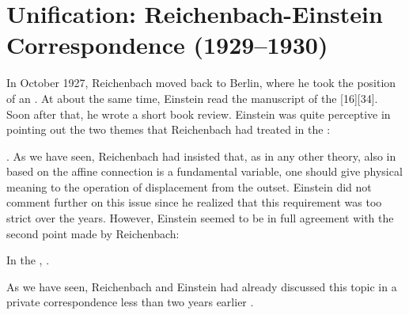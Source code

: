 \documentclass[draft]{article}
\renewcommand{\me}{;~m.e.{}}
\newcommand{\PRZL}{\citetitle{Reichenbach1928}\xspace}
\begin{document}
\section{Unification: Reichenbach-Einstein Correspondence (1929--1930)}
\label{unification}
%
In October 1927, Reichenbach moved back to Berlin, where he took the position of an  \citep{Hecht1982}. At about the same time, Einstein read the manuscript of the \PRZL {}[16][34]. Soon after that, he wrote a short book review. Einstein was quite perceptive in pointing out the two themes that Reichenbach had treated in the \Ap: \begin{inparaenum}[(1)] \item {} \citep[20\me]{Einstein1928d}. As we have seen, Reichenbach had insisted that, as in any other theory, also in \uft based on the affine connection is a fundamental variable, one should give physical meaning to the operation of displacement from the outset. Einstein did not comment further on this issue since he realized that this requirement was too strict over the years. However, Einstein seemed to be in full agreement with the second point made by Reichenbach: \item In the \Ap,  \citep[20\me]{Einstein1928d}. \end{inparaenum} As we have seen, Reichenbach and Einstein had already discussed this topic in a private correspondence less than two years earlier . 
\end{document}
